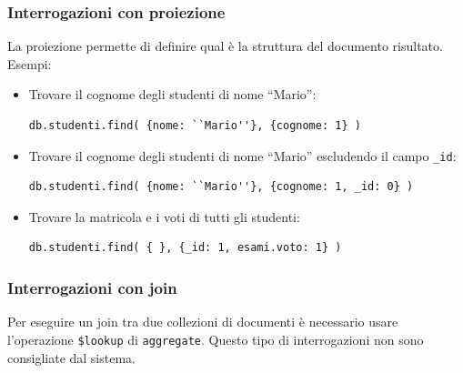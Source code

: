 \documentclass{report}
\begin{document}
\subsubsection{Interrogazioni con proiezione}

La proiezione permette di definire qual \`e la struttura del documento risultato.\\
Esempi:
\begin{itemize}
\item Trovare il cognome degli studenti di nome ``Mario'':
\begin{lstlisting}
db.studenti.find( {nome: ``Mario''}, {cognome: 1} )
\end{lstlisting}
\item Trovare il cognome degli studenti di nome ``Mario'' escludendo il campo \texttt{\_id}:
\begin{lstlisting}
db.studenti.find( {nome: ``Mario''}, {cognome: 1, _id: 0} )
\end{lstlisting}
\item Trovare la matricola e i voti di tutti gli studenti:
\begin{lstlisting}
db.studenti.find( { }, {_id: 1, esami.voto: 1} )
\end{lstlisting}
\end{itemize}

\subsubsection{Interrogazioni con join}

Per eseguire un join tra due collezioni di documenti \`e necessario usare l'operazione \texttt{\$lookup} di \texttt{aggregate}. Questo tipo di interrogazioni non sono consigliate dal sistema. 
\end{document}
